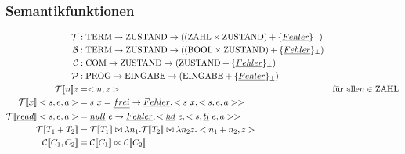 \subsubsection{Semantikfunktionen}
\begin{align*}
\mathcal{T} &: \text{\lstinline!TERM!} \rightarrow \text{\lstinline!ZUSTAND!} \rightarrow ((\text{\lstinline!ZAHL!} \times \text{\lstinline!ZUSTAND!} ) + \{\underline{Fehler}\}_\perp)\\
\mathcal{B} &: \text{\lstinline!TERM!} \rightarrow \text{\lstinline!ZUSTAND!} \rightarrow ((\text{\lstinline!BOOL!} \times \text{\lstinline!ZUSTAND!} ) + \{\underline{Fehler}\}_\perp)\\
\mathcal{C} &: \text{\lstinline!COM!} \rightarrow \text{\lstinline!ZUSTAND!} \rightarrow (\text{\lstinline!ZUSTAND!} + \{\underline{Fehler}\}_\perp)\\
\mathcal{P} &: \text{\lstinline!PROG!} \rightarrow \text{\lstinline!EINGABE!} \rightarrow (\text{\lstinline!EINGABE!} + \{\underline{Fehler}\}_\perp)\\
\mathcal{T} [\![ n ]\!] z &= <n,z> & \text{für alle} n \in \text{\lstinline!ZAHL!}\\
\mathcal{T} [\![ x ]\!] <s,e,a> &= s\ x = \underline{frei} \rightarrow \underline{Fehler}, <s\ x, <s,e,a>>\\
\mathcal{T} [\![ \underline{read} ]\!] <s,e,a> &= \underline{null}\ e \rightarrow \underline{Fehler}, <\underline{hd}\ e, <s, \underline{tl}\ e, a>>\\
\mathcal{T} [\![ T_1 + T_2 ]\!]  &= \mathcal{T} [\![ T_1]\!]  \bowtie \lambda n_1.\mathcal{T} [\![ T_2 ]\!]  \bowtie \lambda n_2 z . <n_1 + n_2, z>\\
\mathcal{C} [\![ C_1, C_2 ]\!]  &= \mathcal{C} [\![ C_1]\!]  \bowtie \mathcal{C} [\![ C_2]\!]  
\end{align*}